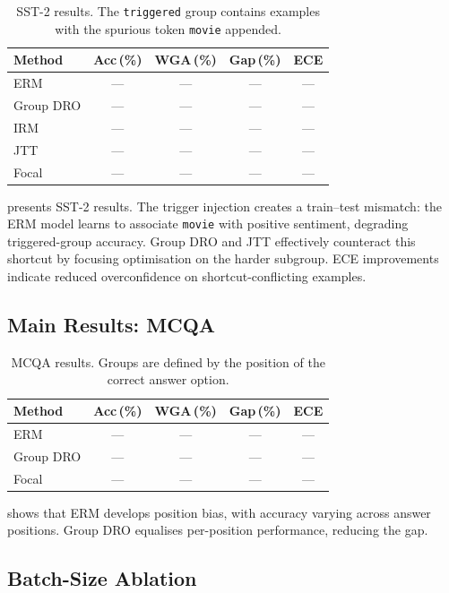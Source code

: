 \documentclass[10pt,twocolumn]{article}
\begin{document}
\begin{table}[t]
\centering
\caption{SST-2 results.  The \texttt{triggered} group contains
examples with the spurious token \texttt{movie} appended.}
\label{tab:sst2}
\small
\begin{tabular}{@{}lcccc@{}}
\toprule
Method & Acc\,(\%) & WGA\,(\%) & Gap\,(\%) & ECE \\
\midrule
ERM        & --- & --- & --- & --- \\
Group DRO  & --- & --- & --- & --- \\
IRM        & --- & --- & --- & --- \\
JTT        & --- & --- & --- & --- \\
Focal      & --- & --- & --- & --- \\
\bottomrule
\end{tabular}
\end{table}

 presents SST-2 results.
The trigger injection creates a train--test mismatch: the ERM
model learns to associate \texttt{movie} with positive
sentiment, degrading triggered-group accuracy.
Group DRO and JTT effectively counteract this shortcut by
focusing optimisation on the harder subgroup.
ECE improvements indicate reduced overconfidence on
shortcut-conflicting examples.

\subsection{Main Results: MCQA}
\label{subsec:res_mcqa}

\begin{table}[t]
\centering
\caption{MCQA results.  Groups are defined by the position of
the correct answer option.}
\label{tab:mcqa}
\small
\begin{tabular}{@{}lcccc@{}}
\toprule
Method & Acc\,(\%) & WGA\,(\%) & Gap\,(\%) & ECE \\
\midrule
ERM        & --- & --- & --- & --- \\
Group DRO  & --- & --- & --- & --- \\
Focal      & --- & --- & --- & --- \\
\bottomrule
\end{tabular}
\end{table}

 shows that ERM develops position bias, with
accuracy varying across answer positions.
Group DRO equalises per-position performance, reducing the gap.

\subsection{Batch-Size Ablation}
\label{subsec:batch_ablation}
\end{document}
